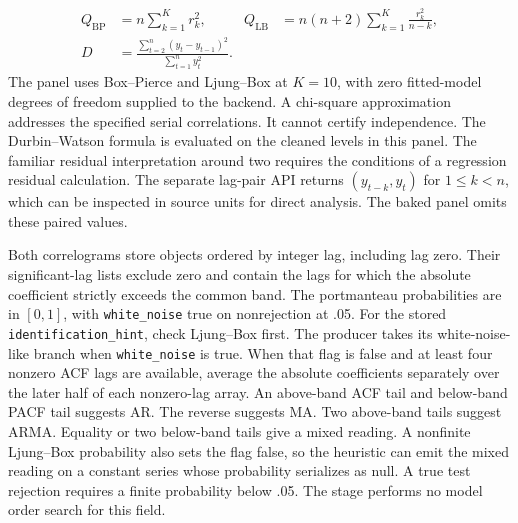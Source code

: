 \begin{align}
 Q_{\mathrm{BP}} &= n\sum_{k=1}^{K} r_k^2,&
 Q_{\mathrm{LB}} &=n(n+2)\sum_{k=1}^{K}\frac{r_k^2}{n-k},\\
 D &=\frac{\sum_{t=2}^{n}(y_t-y_{t-1})^2}{\sum_{t=1}^{n}y_t^2}.
\end{align}
The panel uses Box--Pierce and Ljung--Box at $K=10$, with zero fitted-model degrees of freedom supplied to the backend. A chi-square approximation addresses the specified serial correlations. It cannot certify independence. The Durbin--Watson formula is evaluated on the cleaned levels in this panel. The familiar residual interpretation around two requires the conditions of a regression residual calculation. The separate lag-pair API returns $(y_{t-k},y_t)$ for $1\le k<n$, which can be inspected in source units for direct analysis. The baked panel omits these paired values.

Both correlograms store objects ordered by integer lag, including lag zero.
Their significant-lag lists exclude zero and contain the lags for which
the absolute coefficient strictly exceeds the common band. The portmanteau
probabilities are in $[0,1]$, with \texttt{white\_noise} true on nonrejection
at .05. For the stored \texttt{identification\_hint}, check Ljung--Box
first. The producer takes its white-noise-like branch when
\texttt{white\_noise} is true. When that flag is false and at least
four nonzero ACF lags are available,
average the absolute coefficients separately over the later half of
each nonzero-lag array. An above-band ACF tail and below-band PACF tail
suggests AR. The reverse suggests MA. Two above-band tails suggest
ARMA. Equality or two below-band tails give a mixed reading.
A nonfinite Ljung--Box probability also sets the flag false, so the
heuristic can emit the mixed reading on a constant series whose
probability serializes as null. A true test rejection requires a finite
probability below .05. The stage performs no model order search for
this field.

